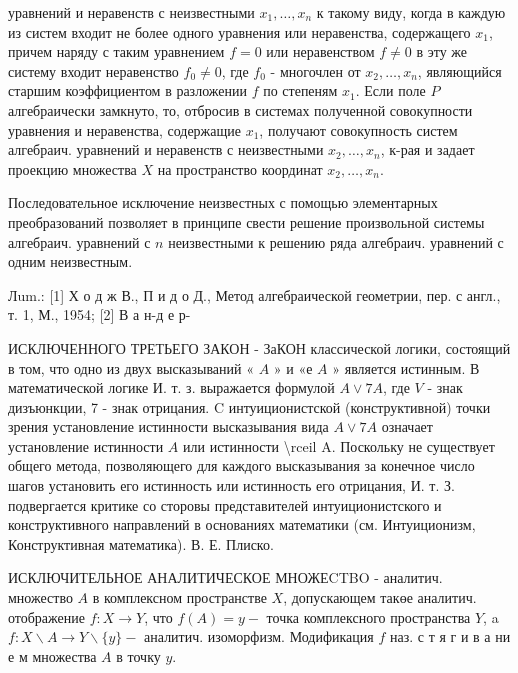 \documentclass[10pt]{article}
\begin{document}
уравнений и неравенств с неизвестными $x_{1}, \ldots, x_{n}$ к такому виду, когда в каждую из систем входит не более одного уравнения или неравенства, содержащего $x_{1}$, причем наряду с таким уравнением $f=0$ или неравенством $f \neq 0$ в эту же систему входит неравенство $f_{0} \neq 0$, где $f_{0}$ - многочлен от $x_{2}, \ldots, x_{n}$, являющийся старшим коэффициентом в разложении $f$ по степеням $x_{1}$. Если поле $P$ алгебраически замкнуто, то, отбросив в системах полученной совокупности уравнения и неравенства, содержащие $x_{1}$, получают совокупность систем алгебраич. уравнений и неравенств с неизвестными $x_{2}, \ldots, x_{n}$, к-рая и задает проекцию множества $X$ на пространство координат $x_{2}, \ldots, x_{n}$.



Последовательное исключение неизвестных с помощью элементарных преобразований позволяет в принципе свести решение произвольной системы алгебраич. уравнений с $n$ неизвестными к решению ряда алгебраич. уравнений с одним неизвестным.



Лum.: [1] Х о д ж В., П и д о Д., Метод алгебраической геометрии, пер. с англ., т. 1, М., 1954; [2] В а н-д е р-



ИСКЛЮЧЕННОГО ТРЕТЬЕГО ЗАКОН - ЗаКОН классической логики, состоящий в том, что одно из двух высказываний « $A$ » и «е $A$ » является истинным. В математической логике И. т. з. выражается формулой $A \vee 7 A$, где $V$ - знак дизъюнкции, 7 - знак отрицания. $\mathrm{C}$ интуиционистской (конструктивной) точки зрения установление истинности высказывания вида $A \vee 7 A$ означает установление истинности $A$ или истинности \textbackslash rceil A. Поскольку не существует общего метода, позволяющего для каждого высказывания за конечное число шагов установить его истинность или истинность его отрицания, И. т. З. подвергается критике со сторовы представителей интуиционистского и конструктивного направлений в основаниях математики (см. Интуиционизм, Конструктивная математика). В. Е. Плиско.



ИСКЛЮЧИТЕЛЬНОЕ АНАЛИТИЧЕСКОЕ МНОЖЕCTBO - аналитич. множество $A$ в комплексном пространстве $X$, допускающем такөе аналитич. отображение $f: X \rightarrow Y$, что $f(A)=y-$ точка комплексного пространства $Y$, a $f: X \backslash A \rightarrow Y \backslash\{y\}-$ аналитич. изоморфизм. Модификация $f$ наз. с т я г и в а ни е м множества $A$ в точку $y$.
\end{document}
